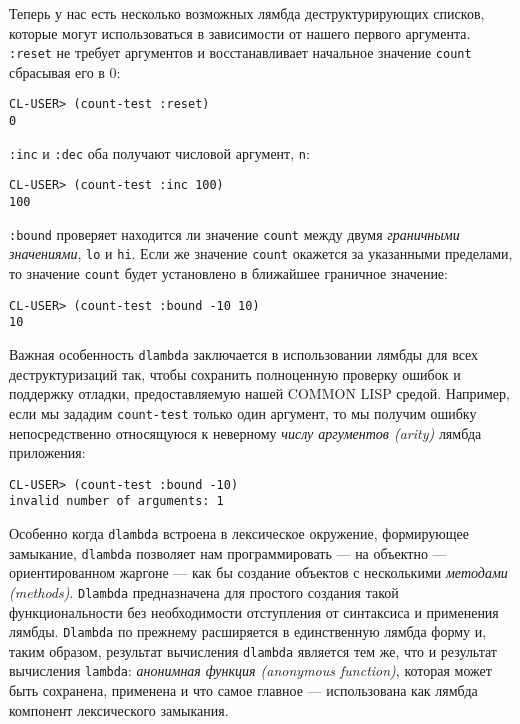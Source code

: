 Теперь у нас есть несколько возможных лямбда деструктурирующих списков, которые могут использоваться в зависимости от нашего первого аргумента. \verb":reset" не требует аргументов и восстанавливает начальное значение \verb"count" сбрасывая его в 0:

\begin{verbatim}
CL-USER> (count-test :reset)
0
\end{verbatim}

\verb":inc" и \verb":dec" оба получают числовой аргумент, \verb"n":

\begin{verbatim}
CL-USER> (count-test :inc 100)
100
\end{verbatim}

\verb":bound" проверяет находится ли значение \verb"count" между двумя \emph{граничными значениями}, \verb"lo" и \verb"hi". Если же значение \verb"count" окажется за указанными пределами, то значение \verb"count" будет установлено в ближайшее граничное значение:

\begin{verbatim}
CL-USER> (count-test :bound -10 10)
10
\end{verbatim}

Важная особенность \verb"dlambda" заключается в использовании лямбды для всех деструктуризаций так, чтобы сохранить полноценную проверку ошибок и поддержку отладки, предоставляемую нашей COMMON LISP средой. Например, если мы зададим \verb"count-test" только один аргумент, то мы получим ошибку непосредственно относящуюся к неверному \emph{числу аргументов (arity)} лямбда приложения:

\begin{verbatim}
CL-USER> (count-test :bound -10)
invalid number of arguments: 1
\end{verbatim}

Особенно когда \verb"dlambda" встроена в лексическое окружение, формирующее замыкание, \verb"dlambda" позволяет нам программировать --- на объектно --- ориентированном жаргоне --- как бы создание объектов с несколькими \emph{методами (methods)}. \verb"Dlambda" предназначена для простого создания такой функциональности без необходимости отступления от синтаксиса и применения лямбды. \verb"Dlambda" по прежнему расширяется в единственную лямбда форму и, таким образом, результат вычисления \verb"dlambda" является тем же, что и результат вычисления \verb"lambda": \emph{анонимная функция (anonymous function)}, которая может быть сохранена, применена и что самое главное --- использована как лямбда компонент лексического замыкания.

